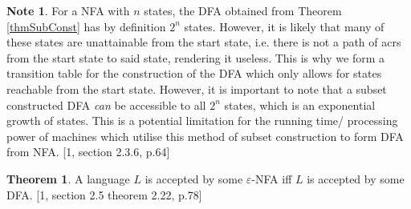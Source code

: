 \documentclass[a4paper,12pt]{report}
\theoremstyle{definition}
\newtheorem{theorem}{Theorem}[chapter]
\newtheorem{note}{Note}[subsection]
\begin{document}
\begin{note}
For a NFA with $n$ states, the DFA obtained from Theorem \ref{thmSubConst} has by definition $2^n$ states.  However, it is likely that many of these states are unattainable from the start state, i.e. there is not a path of acrs from the start state to said state, rendering it useless. This is why we form a transition table for the construction of the DFA which only allows for states reachable from the start state. However, it is important to note that a subset constructed DFA \textit{can} be accessible to all $2^n$ states, which is an exponential growth of states. This is a potential limitation for the running time/ processing power of machines which utilise this method of subset construction to form DFA from NFA. [1, section 2.3.6, p.64]
\end{note}

\begin{theorem}
\label{DFA<->eNFA}
A language $L$ is accepted by some $\varepsilon$-NFA iff $L$ is accepted by some DFA. [1, section 2.5 theorem 2.22, p.78]
\end{theorem}
\end{document}
